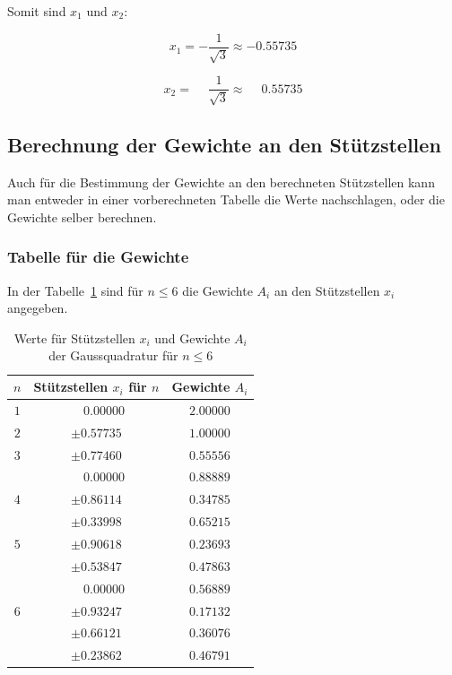 Somit sind $ x_{1} $ und $ x_{2} $:

\begin{equation*}
    x_{1} = -\frac{1}{\sqrt{3}} \approx -0.55735
\end{equation*}

\begin{equation}
    x_{2} = \phantom{-} \frac{1}{\sqrt{3}} \approx \phantom{-}0.55735
\end{equation}

\subsection{Berechnung der Gewichte an den Stützstellen
\label{quadratur:subsection:gewichtsberechnung}}
Auch für die Bestimmung der Gewichte an den berechneten Stützstellen kann man entweder
in einer vorberechneten Tabelle die Werte nachschlagen, oder die Gewichte selber berechnen.

\subsubsection{Tabelle für die Gewichte}
In der Tabelle~\ref{buch:table:gaussgewichtwerte} sind für $ n \leq 6 $ die Gewichte $A_{i}$
an den Stützstellen $x_{i} $ angegeben.

\begin{table}[h!]
    \centering
    \begin{tabular}{|c|c|c|}
        \hline
        $n$ & Stützstellen $x_{i}$ für $n$ & Gewichte $A_{i}$\\
        \hline
        $1$ & $ \phantom{-} 0.00000 $ & $ 2.00000 $ \\
        \hline
        $2$ & $ \pm 0.57735 $ & $ 1.00000 $ \\
        \hline
        $3$ & $ \pm 0.77460 $ & $ 0.55556 $ \\
            & $ \phantom{-} 0.00000 $ & $ 0.88889 $ \\
        \hline
        $4$ & $ \pm 0.86114 $ & $ 0.34785 $ \\
            & $ \pm 0.33998 $ & $ 0.65215 $ \\
        \hline
        $5$ & $ \pm 0.90618 $ & $ 0.23693 $ \\
            & $ \pm 0.53847 $ & $ 0.47863 $ \\
            & $ \phantom{-} 0.00000 $ & $ 0.56889 $ \\
        \hline
        $6$ & $ \pm 0.93247 $ & $ 0.17132 $ \\
            & $ \pm 0.66121 $ & $ 0.36076 $ \\
            & $ \pm 0.23862 $ & $ 0.46791 $ \\
        \hline
    \end{tabular}
    \caption{Werte für Stützstellen $x_{i}$ und Gewichte $A_{i}$ der Gaussquadratur für $n \leq 6$
    \label{buch:table:gaussgewichtwerte}}    
\end{table}

